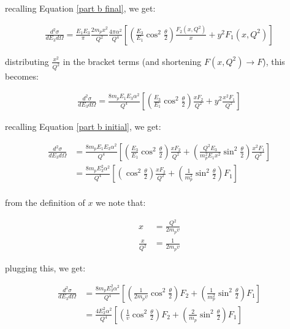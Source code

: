 \documentclass[11pt]{article}
\theoremstyle{definition}
\begin{document}
recalling Equation \ref{part b final}, we get:

\begin{align}
    \frac{d^2\sigma}{dE_3d\Omega}
    =
    \frac{E_1E_3}{\pi}
    \frac{2m_px^2}{Q^2}
    \frac{4\pi\alpha^2}{Q^4}
    \left[
        \left(
           \frac{E_3}{E_1}
           \cos^2\frac{\theta}{2}
        \right)
        \frac{F_2(x,Q^2)}{x}
        +
        y^2F_1(x,Q^2)
    \right]
\end{align}

distributing $\frac{x^2}{Q^2}$ in the bracket terms (and shortening $F(x,Q^2)\to F$), this becomes:

\begin{align}
    \frac{d^2\sigma}{dE_3d\Omega}
    =
    \frac{8m_pE_1E_3\alpha^2}{Q^4}
    \left[
        \left(
           \frac{E_3}{E_1}
           \cos^2\frac{\theta}{2}
        \right)
        \frac{xF_2}{Q^2}
        +
        y^2
        \frac{x^2F_1}{Q^2}
    \right]
\end{align}

recalling Equation \ref{part b initial}, we get:

\begin{align}
    \frac{d^2\sigma}{dE_3d\Omega}
    &=
    \frac{8m_pE_1E_3\alpha^2}{Q^4}
    \left[
        \left(
           \frac{E_3}{E_1}
           \cos^2\frac{\theta}{2}
        \right)
        \frac{xF_2}{Q^2}
        +
        \left(\frac{Q^2E_3}{m_p^2E_1x^2}
        \sin^2\frac{\theta}{2}\right)
        \frac{x^2F_1}{Q^2}
    \right]\\
    &=
    \frac{8m_pE_3^2\alpha^2}{Q^4}
    \left[
        \left(
        \cos^2\frac{\theta}{2}
        \right)
        \frac{xF_2}{Q^2}
        +
        \left(
            \frac{1}{m_p^2}
        \sin^2\frac{\theta}{2}\right)
        F_1
    \right]\\
\end{align}

from the definition of $x$ we note that:

\begin{align}
    x &= \frac{Q^2}{2m_pv}\\
    \frac{x}{Q^2} &= \frac{1}{2m_pv}
\end{align}

plugging this, we get:

\begin{align}
    \frac{d^2\sigma}{dE_3d\Omega}
    &=
    \frac{8m_pE_3^2\alpha^2}{Q^4}
    \left[
        \left(
            \frac{1}{2m_pv}
            \cos^2\frac{\theta}{2}
        \right)
        F_2
        +
        \left(
            \frac{1}{m_p^2}
        \sin^2\frac{\theta}{2}\right)
        F_1
    \right]\\
    &=
    \frac{4E_3^2\alpha^2}{Q^4}
    \left[
        \left(
            \frac{1}{v}
            \cos^2\frac{\theta}{2}
        \right)
        F_2
        +
        \left(
            \frac{2}{m_p}
        \sin^2\frac{\theta}{2}\right)
        F_1
    \right]\\
\end{align}
\end{document}
